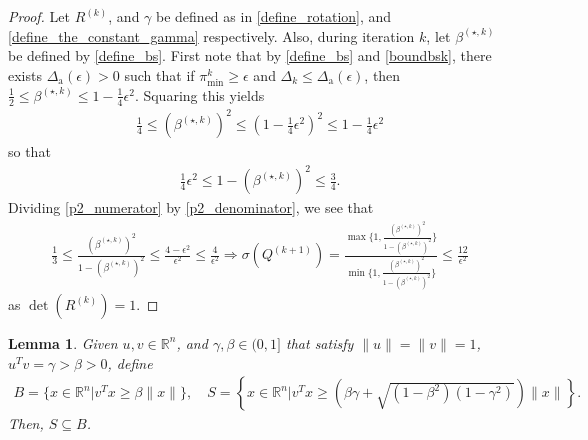 \documentclass{article}
\newtheorem{lemma}[theorem]{Lemma}
\theoremstyle{case}
\numberwithin{theorem}{subsection}
\newcommand{\bs}{{\beta^{(\star, k)}}}
\newcommand{\ck}{{c^{(k)}}}
\newcommand{\dacco}{{\Delta_{\textrm{a}}}}
\newcommand{\dk}{\Delta_k}
\newcommand{\huk}{{{\hat u}^{(k)}}}
\newcommand{\qk}{{Q^{(k)}}}
\newcommand{\Rn}{\mathbb R^n}
\newcommand{\rotk}{{R^{(k)}}}
\newcommand{\sdk}{{\delta_k}}
\newcommand{\thetamink}{{\pi^k_{\textrm{min}}}}
\newcommand{\xk}{x^{(k)}}
\newcommand{\qkpo}{{Q^{(k+1)}}}
\begin{document}
\begin{proof}
Let $\rotk$, and $\gamma$ be defined as in \cref{define_rotation}, and \cref{define_the_constant_gamma} respectively.
Also, during iteration $k$, let $\bs$ be defined by \cref{define_bs}.
First note that by \cref{define_bs} and \cref{boundbsk}, there exists $\dacco(\epsilon) > 0$ such that if 
$\thetamink \ge \epsilon$ and $\dk \le \dacco(\epsilon)$, then
$\frac {1} 2 \le \bs \le 1 - \frac 1 4 \epsilon^2$.
Squaring this yields
\begin{align}
\frac {1} 4 \le \left(\bs\right)^2 \le \left(1 - \frac 1 4 \epsilon^2\right)^2 \le 1 - \frac 1 4 \epsilon^2 \label{p2_numerator}
\end{align}
so that
\begin{align}
\frac 1 4 \epsilon^2 \le 1 - \left(\bs\right)^2 \le \frac 3 4. \label{p2_denominator}
\end{align}
Dividing \cref{p2_numerator} by \cref{p2_denominator}, we see that
\begin{align*}
\frac 1 3
\le \frac{\left(\bs\right)^2}{1 - \left(\bs\right)^2}
\le \frac {4 - \epsilon^2}{\epsilon^2} \le \frac {4}{\epsilon^2}
\Longrightarrow 
\sigma \left(\qkpo\right) 
= \frac{\max\{1, \frac{\left(\bs\right)^2}{1 - \left(\bs\right)^2}\}}{\min\{1, \frac{\left(\bs\right)^2}{1 - \left(\bs\right)^2}\}} 
\le \frac {12}{\epsilon^2}
\end{align*}
as $\det(\rotk) = 1$.
\end{proof}




\begin{lemma}
\label{cone_subset_cone}
Given $u, v \in \Rn$, and $\gamma, \beta \in (0, 1]$ that satisfy $\|u\| = \|v\|= 1$, $u^Tv = \gamma > \beta > 0$, define
\begin{align*}
B = \{x\in\Rn | {v}^Tx \ge \beta\|x\|\}, \quad
S = \left\{x\in\Rn \bigg| v^Tx \ge \left(\beta\gamma + \sqrt{(1 - \beta^2)\left(1 - \gamma^2\right)}\right)\|x\| \right\}. 
\end{align*}
Then, $S \subseteq B$.
\end{lemma}
\end{document}
